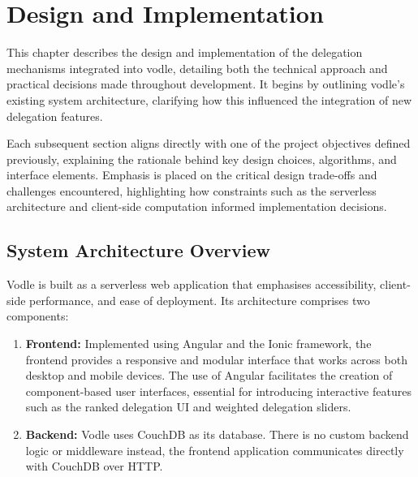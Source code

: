 \chapter{Design and Implementation}
\label{ch:design_implementation}
This chapter describes the design and implementation of the delegation mechanisms integrated into vodle, detailing both the technical approach and practical decisions made throughout development. It begins by outlining vodle's existing system architecture, clarifying how this influenced the integration of new delegation features. 

Each subsequent section aligns directly with one of the project objectives defined previously, explaining the rationale behind key design choices, algorithms, and interface elements. Emphasis is placed on the critical design trade-offs and challenges encountered, highlighting how constraints such as the serverless architecture and client-side computation informed implementation decisions.

\section{System Architecture Overview}\label{sec:design_architecture}
Vodle is built as a serverless web application that emphasises accessibility, client-side performance, and ease of deployment. Its architecture comprises two components:

\begin{enumerate}
  \item \textbf{Frontend:} Implemented using Angular and the Ionic framework, the frontend provides a responsive and modular interface that works across both desktop and mobile devices. The use of Angular facilitates the creation of component-based user interfaces, essential for introducing interactive features such as the ranked delegation UI and weighted delegation sliders.
  \item \textbf{Backend:} Vodle uses CouchDB as its database. There is no custom backend logic or middleware
  instead, the frontend application communicates directly with CouchDB over HTTP.
\end{enumerate}


